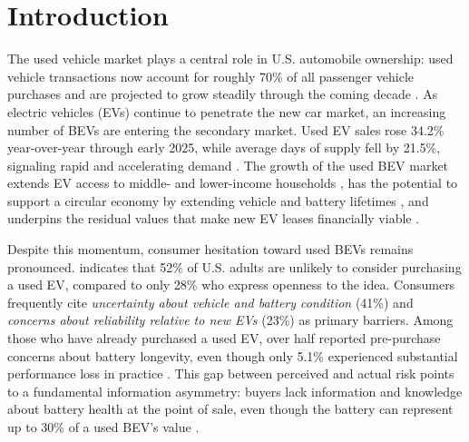 \documentclass[a4paper,fleqn]{cas-sc}   %
\begin{document}
\section{Introduction}
\label{section:intro}

The used vehicle market plays a central role in U.S. automobile ownership: used vehicle transactions now account for roughly 70\% of all passenger vehicle purchases and are projected to grow steadily through the coming decade \parencite{marketresearchfutureUnitedStatesUsed2025}. As electric vehicles (EVs) continue to penetrate the new car market, an increasing number of BEVs are entering the secondary market. Used EV sales rose 34.2\% year-over-year through early 2025, while average days of supply fell by 21.5\%, signaling rapid and accelerating demand \parencite{coxautomotiveinc.EVMarketMonitor2025}. The growth of the used BEV market extends EV access to middle- and lower-income households \parencite{hagmanTotalCostOwnership2016}, has the potential to support a circular economy by extending vehicle and battery lifetimes \parencite{guzekElectricVehiclesOverview2024}, and underpins the residual values that make new EV leases financially viable \parencite{bruckmannResaleAnxietyObstacle2021, limMassAdoptionElectric2015}.

Despite this momentum, consumer hesitation toward used BEVs remains pronounced. \textcite{fernandesUSUnderstandingConsumer2023} indicates that 52\% of U.S. adults are unlikely to consider purchasing a used EV, compared to only 28\% who express openness to the idea. Consumers frequently cite \textit{uncertainty about vehicle and battery condition} (41\%) and \textit{concerns about reliability relative to new EVs} (23\%) as primary barriers. Among those who have already purchased a used EV, over half reported pre-purchase concerns about battery longevity, even though only 5.1\% experienced substantial performance loss in practice \parencite{sheykhfardAnalyzingPurchaseIntentions2025}. This gap between perceived and actual risk points to a fundamental information asymmetry: buyers lack information and knowledge about battery health at the point of sale, even though the battery can represent up to 30\% of a used BEV's value \parencite{boudwayBatteriesElectricCars2020}.
\end{document}

